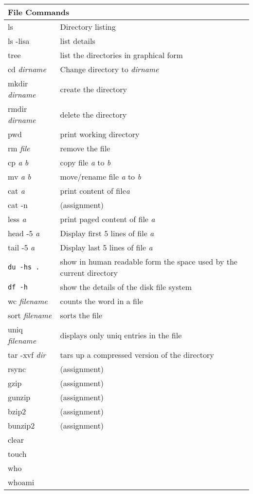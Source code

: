 \begin{center}
\begin{longtable}{|p{4cm}|p{8cm}|}
  \hline
  \multicolumn{2}{|l|}{\cellcolor{blue!15} File Commands}\\
  \hline
  ls & Directory listing\\
  ls -lisa & list details \\
  tree & list the directories in graphical form \\
  cd \emph{dirname} & Change directory to \emph{dirname} \\
  mkdir \emph{dirname} & create the directory \\
  rmdir \emph{dirname} & delete the directory \\
  pwd & print working directory \\
  rm \emph{file} & remove the file \\
  cp \emph{a} \emph{b} & copy file \emph{a} to \emph{b} \\
  mv \emph{a} \emph{b} & move/rename file \emph{a} to \emph{b}\\
  cat \emph{a} & print content of file\emph{a}\\
  cat -n &  (assignment) \\
  less \emph{a} & print paged content of file \emph{a}\\
  head -5 \emph{a} & Display first 5 lines of file \emph{a}\\
  tail -5 \emph{a} & Display last 5 lines of file \emph{a}\\
  \verb|du -hs .| & show in human readable form the space used by the current
             directory\\
  \verb|df -h| & show the details of the disk file system \\
  wc \textit{filename}&  counts the word in a file \\
  sort \textit{filename} &  sorts the file \\
  uniq \textit{filename} &  displays only uniq entries in the file \\
  tar -xvf \textit{dir} &  tars up a compressed version of the directory \\
  rsync &  (assignment) \\
  gzip &  (assignment) \\
  gunzip &  (assignment) \\
  bzip2 &  (assignment) \\
  bunzip2 &  (assignment) \\
  clear & \\
  touch & \\
  who & \\
  whoami & \\

\end{longtable}
\end{center}
